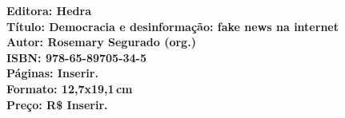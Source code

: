 \vfill
\noindent\begin{minipage}[c]{1\linewidth}
{\small\textbf{
\hspace*{-.1cm}Editora: Hedra\\
Título: Democracia e desinformação: fake news na internet\\
Autor: Rosemary Segurado (org.)\\ 
ISBN: 978-65-89705-34-5\\
Páginas: Inserir.\\
Formato: 12,7x19,1\,cm\\
Preço: R\$ Inserir.\\
}}
\end{minipage}
\pagebreak

\vspace*{1.5cm}
\bigskip

\hfill{}
\bigskip
\bigskip
\bigskip

